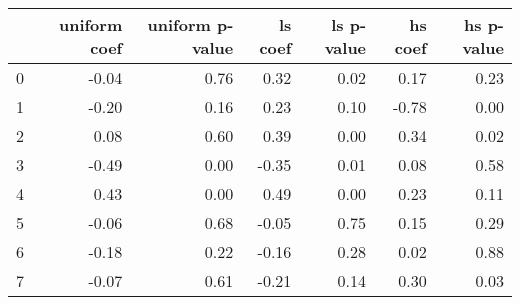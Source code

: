 \begin{tabular}{lrrrrrr}
\toprule
 & uniform coef & uniform p-value & ls coef & ls p-value & hs coef & hs p-value \\
\midrule
0 & -0.04 & 0.76 & 0.32 & 0.02 & 0.17 & 0.23 \\
1 & -0.20 & 0.16 & 0.23 & 0.10 & -0.78 & 0.00 \\
2 & 0.08 & 0.60 & 0.39 & 0.00 & 0.34 & 0.02 \\
3 & -0.49 & 0.00 & -0.35 & 0.01 & 0.08 & 0.58 \\
4 & 0.43 & 0.00 & 0.49 & 0.00 & 0.23 & 0.11 \\
5 & -0.06 & 0.68 & -0.05 & 0.75 & 0.15 & 0.29 \\
6 & -0.18 & 0.22 & -0.16 & 0.28 & 0.02 & 0.88 \\
7 & -0.07 & 0.61 & -0.21 & 0.14 & 0.30 & 0.03 \\
\bottomrule
\end{tabular}
